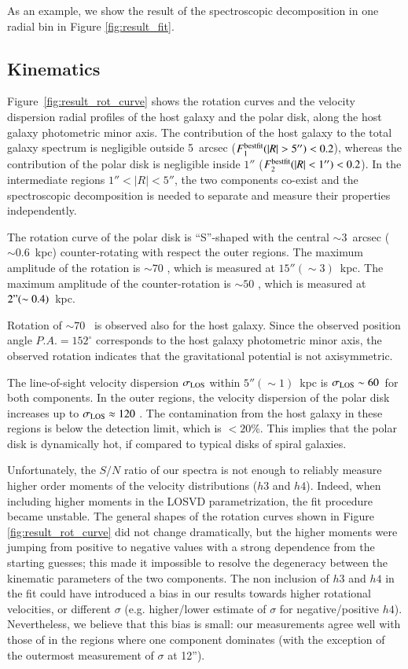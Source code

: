 \documentclass{aa}
\begin{document}
As an example, we show the result of the spectroscopic decomposition
  in one radial bin in Figure \ref{fig:result_fit}.

\subsection{Kinematics}

Figure~\ref{fig:result_rot_curve} shows the rotation curves and the
velocity dispersion radial profiles of the host galaxy and the polar
disk, along the host galaxy  photometric minor axis. The
contribution of the host galaxy to the total galaxy spectrum is
negligible outside 5~arcsec ($F_1^{\rm best fit}(|R|>5'') < 0.2$),
whereas the contribution of the polar disk is negligible inside $1''$
($F_2^{\rm best fit}(|R|<1'') < 0.2$). In the intermediate regions
$1''<|R|<5''$, the two components co-exist and the spectroscopic
decomposition is needed to separate and measure their
  properties independently.

The rotation curve of the polar disk is ``S''-shaped with the central
$\sim 3$~arcsec ($\sim 0.6$~kpc) counter-rotating with respect the
outer regions. The maximum amplitude of the rotation is $\sim 70$
\kms, which is measured at $15'' (\sim 3)$~kpc. The maximum amplitude of the
counter-rotation is $\sim 50$ \kms, which is measured at $2" (\sim 0.4)$~kpc.

Rotation of $\sim 70$ \kms\ is observed also for the host
galaxy. Since the observed position angle $P.A.=152^{\circ}$
corresponds to the host galaxy photometric minor axis, the observed
rotation indicates that the gravitational potential is not
axisymmetric.

The line-of-sight velocity dispersion $\sigma_{\rm LOS}$ within
$5''(\sim 1)$~kpc is $\sigma_{\rm LOS} \sim 60$\kms\ for both
components. In the outer regions, the velocity dispersion of the polar
disk increases up to $\sigma_{\rm LOS} \approx 120$ \kms.  The
contamination from the host galaxy in these regions is below the
detection limit, which is $<20$\%. This implies that the polar disk is
dynamically hot, if compared to typical disks of spiral galaxies.

Unfortunately, the $S/N$ ratio of our spectra is not enough to
reliably measure higher order moments of the velocity distributions
($h3$ and $h4$). Indeed, when including higher moments in the LOSVD
parametrization, the fit procedure became unstable. The general shapes
of the rotation curves shown in Figure \ref{fig:result_rot_curve} did
not change dramatically, but the higher moments were jumping from
positive to negative values with a strong dependence from the
starting guesses; this made it impossible to resolve the degeneracy
between the kinematic parameters of the two components. The non
inclusion of $h3$ and $h4$ in the fit could have introduced a bias in
our results towards higher rotational velocities, or different
$\sigma$ (e.g. higher/lower estimate of $\sigma$ for negative/positive
$h4$). Nevertheless, we believe that this bias is small: our
measurements agree well with those of \citet[in which a single
component fit was performed]{Iodice+06} in the regions where one
component dominates (with the exception of the outermost measurement
of $\sigma$ at 12'').
\end{document}
